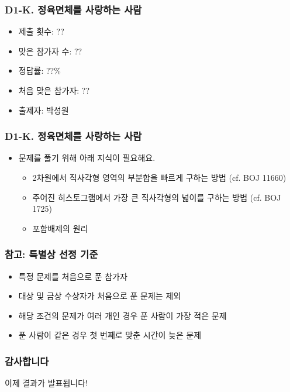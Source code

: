 \documentclass[xetex]{beamer}
\begin{document}
\begin{frame}
  \frametitle{D1-K. 정육면체를 사랑하는 사람}
  \begin{itemize}
    \item 제출 횟수: ??
    \item 맞은 참가자 수: ??
    \item 정답률: ??\%
    \item 처음 맞은 참가자: ??
    \item 출제자: 박성원
  \end{itemize}
\end{frame}

\begin{frame}
  \frametitle{D1-K. 정육면체를 사랑하는 사람}
  \begin{itemize}
    \item 문제를 풀기 위해 아래 지식이 필요해요.
    \begin{itemize}
      \item 2차원에서 직사각형 영역의 부분합을 빠르게 구하는 방법 (cf. BOJ 11660)
      \item 주어진 히스토그램에서 가장 큰 직사각형의 넓이를 구하는 방법 (cf. BOJ 1725)
      \item 포함배제의 원리
    \end{itemize}
  \end{itemize}
\end{frame}



\begin{frame}
  \frametitle{참고: 특별상 선정 기준}
  \begin{itemize}
    \item 특정 문제를 처음으로 푼 참가자
    \item 대상 및 금상 수상자가 처음으로 푼 문제는 제외
    \item 해당 조건의 문제가 여러 개인 경우 푼 사람이 가장 적은 문제
    \item 푼 사람이 같은 경우 첫 번째로 맞춘 시간이 늦은 문제
  \end{itemize}
\end{frame}

\begin{frame}
  \frametitle{감사합니다}
  \begin{center}
    이제 결과가 발표됩니다!
  \end{center}
\end{frame}
\end{document}
